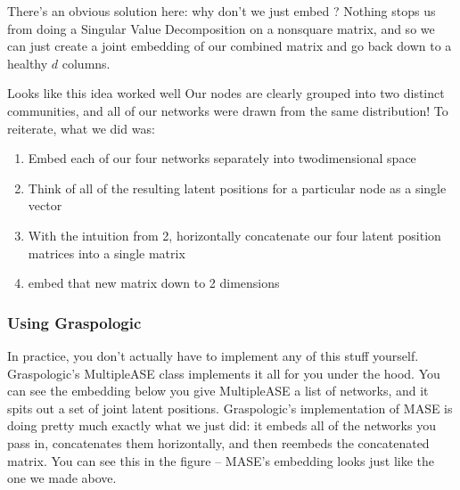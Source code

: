 \documentclass[letterpaper,10pt,english]{jupyterBook}
\begin{document}
\sphinxAtStartPar
There’s an obvious solution here: why don’t we just embed ? Nothing stops us from doing a Singular Value Decomposition on a nonsquare matrix, and so we can just create a joint embedding of our combined matrix and go back down to a healthy \(d\) columns.

\begin{sphinxVerbatim}[commandchars=\\\{\}]
   
    
\end{sphinxVerbatim}

\noindent{}

\sphinxAtStartPar
Looks like this idea worked well \sphinxhyphen{} Our nodes are clearly grouped into two distinct communities, and all of our networks were drawn from the same distribution! To reiterate, what we did was:
\begin{enumerate}
%
\item {} 
\sphinxAtStartPar
Embed each of our four networks separately into two\sphinxhyphen{}dimensional space

\item {} 
\sphinxAtStartPar
Think of all of the resulting latent positions for a particular node as a single vector

\item {} 
\sphinxAtStartPar
With the intuition from 2, horizontally concatenate our four latent position matrices into a single matrix

\item {} 
\sphinxAtStartPar
embed that new matrix down to 2 dimensions

\end{enumerate}


\subsubsection{Using Graspologic}
\label{\detokenize{representations/ch6/multigraph-representation-learning:using-graspologic}}
\sphinxAtStartPar
In practice, you don’t actually have to implement any of this stuff yourself. Graspologic’s MultipleASE class implements it all for you under the hood. You can see the embedding below \sphinxhyphen{} you give MultipleASE a list of networks, and it spits out a set of joint latent positions. Graspologic’s implementation of MASE is doing pretty much exactly what we just did: it embeds all of the networks you pass in, concatenates them horizontally, and then re\sphinxhyphen{}embeds the concatenated matrix. You can see this in the figure – MASE’s embedding looks just like the one we made above.
\end{document}
